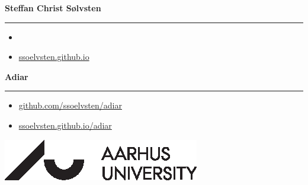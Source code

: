 \begin{frame}
  {\Large \textbf{Steffan Christ Sølvsten}}

  \vspace{1pt} {\hrule width0.45\linewidth}

  \vspace{5pt}

  \begin{itemize}
  \item[\faIcon{envelope}] 
  \item[\faIcon{globe}] \href{https://ssoelvsten.github.io}{ssoelvsten.github.io}
  \end{itemize}

  \vspace{10pt}

  {\Large \textbf{Adiar}}
  \vspace{1pt} {\hrule width0.45\linewidth}

  \vspace{5pt}

  \begin{itemize}
  \item[\faIcon{code}]
    \href{http://github.com/ssoelvsten/adiar}{github.com/ssoelvsten/adiar}
  \item[\faIcon{book}\hspace{2pt}]
    \href{http://ssoelvsten.github.io/adiar}{ssoelvsten.github.io/adiar}
  \end{itemize}


  \vspace{10pt}

  \includegraphics[width=0.2\linewidth]{external/aulogo_uk_var2_black.eps}
\end{frame}